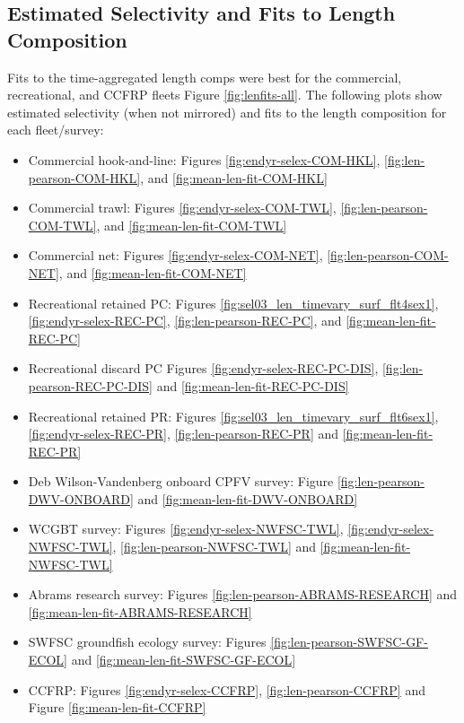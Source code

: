 \documentclass[
  english,
  a4paper,
]{article}
\providecommand{\tightlist}{%
  \setlength{\itemsep}{0pt}\setlength{\parskip}{0pt}}
\begin{document}
\hypertarget{estimated-selectivity-and-fits-to-length-composition}{%
\subsection{Estimated Selectivity and Fits to Length Composition}\label{estimated-selectivity-and-fits-to-length-composition}}

Fits to the time-aggregated length comps were best for the commercial, recreational, and CCFRP fleets Figure \ref{fig:lenfits-all}. The following plots show estimated selectivity (when not mirrored) and fits to the length composition for each
fleet/survey:

\begin{itemize}
\tightlist
\item
  Commercial hook-and-line: Figures \ref{fig:endyr-selex-COM-HKL}, \ref{fig:len-pearson-COM-HKL}, and \ref{fig:mean-len-fit-COM-HKL}
\item
  Commercial trawl: Figures \ref{fig:endyr-selex-COM-TWL}, \ref{fig:len-pearson-COM-TWL}, and \ref{fig:mean-len-fit-COM-TWL}
\item
  Commercial net: Figures \ref{fig:endyr-selex-COM-NET}, \ref{fig:len-pearson-COM-NET}, and \ref{fig:mean-len-fit-COM-NET}
\item
  Recreational retained PC: Figures \ref{fig:sel03_len_timevary_surf_flt4sex1}, \ref{fig:endyr-selex-REC-PC}, \ref{fig:len-pearson-REC-PC}, and \ref{fig:mean-len-fit-REC-PC}
\item
  Recreational discard PC Figures \ref{fig:endyr-selex-REC-PC-DIS}, \ref{fig:len-pearson-REC-PC-DIS} and \ref{fig:mean-len-fit-REC-PC-DIS}
\item
  Recreational retained PR: Figures \ref{fig:sel03_len_timevary_surf_flt6sex1}, \ref{fig:endyr-selex-REC-PR}, \ref{fig:len-pearson-REC-PR} and \ref{fig:mean-len-fit-REC-PR}\\
\item
  Deb Wilson-Vandenberg onboard CPFV survey: Figure \ref{fig:len-pearson-DWV-ONBOARD} and \ref{fig:mean-len-fit-DWV-ONBOARD}
\item
  WCGBT survey: Figures \ref{fig:endyr-selex-NWFSC-TWL}, \ref{fig:endyr-selex-NWFSC-TWL}, \ref{fig:len-pearson-NWFSC-TWL} and \ref{fig:mean-len-fit-NWFSC-TWL}
\item
  Abrams research survey: Figures \ref{fig:len-pearson-ABRAMS-RESEARCH} and \ref{fig:mean-len-fit-ABRAMS-RESEARCH}\\
\item
  SWFSC groundfish ecology survey: Figures \ref{fig:len-pearson-SWFSC-GF-ECOL} and \ref{fig:mean-len-fit-SWFSC-GF-ECOL}\\
\item
  CCFRP: Figures \ref{fig:endyr-selex-CCFRP}, \ref{fig:len-pearson-CCFRP} and Figure \ref{fig:mean-len-fit-CCFRP}
\end{itemize}
\end{document}
